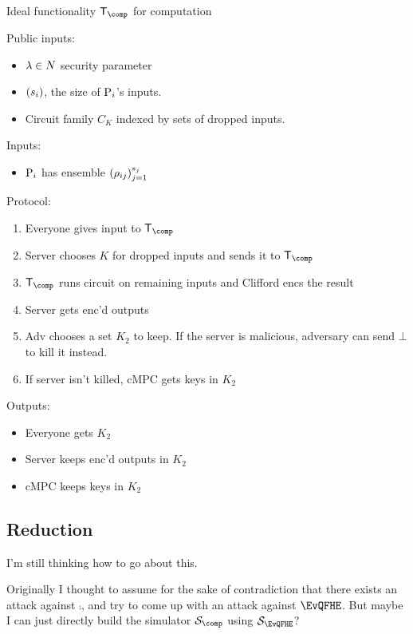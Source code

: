\begin{protocol}{Ideal functionality $\trustp_\comp$ for computation}

	Public inputs:
	\begin{itemize}
		\item $\lambda\in\relax{N}$ security parameter
		\item $\left(s_i\right)$, the size of $\operatorname{P}_i$'s inputs.
		\item Circuit family $C_K$ indexed by sets of dropped inputs.
	\end{itemize}

	Inputs:
	\begin{itemize}
		\item $\operatorname{P}_i$ has ensemble $\left(\rho_{ij}\right)_{j=1}^{s_j}$
	\end{itemize}

	Protocol:
	\begin{enumerate}
		\item Everyone gives input to $\trustp_\comp$
		\item Server chooses $K$ for dropped inputs and sends it to $\trustp_\comp$
		\item $\trustp_\comp$ runs circuit on remaining inputs and Clifford encs the result
		\item Server gets enc'd outputs
		\item Adv chooses a set $K_2$ to keep. If the server is malicious, adversary can send $\bot$ to kill it instead.
		\item If server isn't killed, cMPC gets keys in $K_2$
	\end{enumerate}

	Outputs:
	\begin{itemize}
		\item Everyone gets $K_2$
		\item Server keeps enc'd outputs in $K_2$
		\item cMPC keeps keys in $K_2$
	\end{itemize}
\end{protocol}

\subsection{Reduction}

I'm still thinking how to go about this.

Originally I thought to assume for the sake of contradiction that there exists an attack against $\comp$,
and try to come up with an attack against $\EvQFHE$.
But maybe I can just directly build the simulator $\cS_\comp$ using $\cS_\EvQFHE$?
